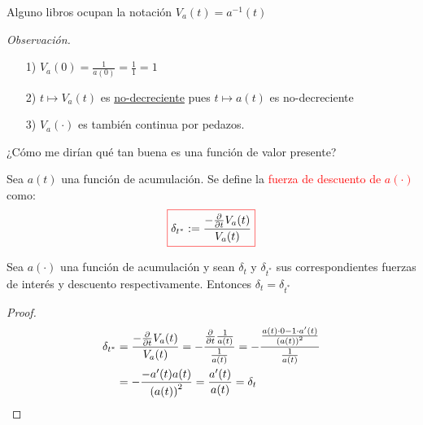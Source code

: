 \begin{definition}
\begin{center}
\end{center}
\end{definition}     


Alguno libros ocupan la notación $V_a(t) = a^{-1}(t)$

\textit{Observación.}

\begin{enumerate}
\item[1)] $V_a(0) = \frac{1}{a(0)} = \frac{1}{1} = 1$
\item[2)] $t \longmapsto V_a(t)$ es \uline{no-decreciente} pues $t \longmapsto a(t)$ es no-decreciente
\item[3)] $V_a(\cdot)$ es también continua por pedazos.
\end{enumerate}

¿Cómo me dirían qué tan buena es una función de valor presente? 

\begin{definition}
Sea $a(t)$ una función de acumulación. Se define la \textcolor{red}{fuerza de descuento de $a(\cdot)$} como:
$$\color{red}\boxed{\color{black} \delta_{t^{*}}:= \frac{-\frac{\partial}{\partial t}V_a(t)}{V_a(t)}}$$
\end{definition}

\begin{proposition}
Sea $a(\cdot)$ una función de acumulación y sean $\delta_t$ y $\delta_{t^*}$ sus correspondientes fuerzas de interés y descuento respectivamente.
Entonces $\delta_t = \delta_{t^{*}}$
\end{proposition}
\begin{proof}
\begin{align*}
\delta_{t^{*}} &= \frac{-\frac{\partial}{\partial t} V_a(t)}{V_a(t)} = - \frac{\frac{\partial}{\partial t}\frac{1}{a(t)}}{\frac{1}{a(t)}} = - \frac{\frac{a(t) \cdot 0 - 1\cdot a'(t)}{\left(a(t) \right)^2 }}{\frac{1}{a(t)}} \\
& = -\frac{-a'(t)a(t)}{\left(a(t) \right)^{2}} = \frac{a'(t)}{a(t)} = \delta_t  
\end{align*}
\end{proof}

